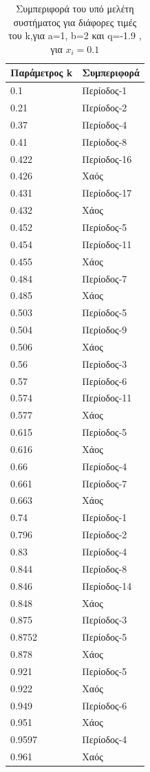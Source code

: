 \begin{table}[h!]
	\centering
	\begin{tabular}{l | l}
		Παράμετρος k & Συμπεριφορά \\
		\hline
		0.1 &  Περίοδος-1 \\
		0.21 &  Περίοδος-2 \\
		0.37& Περίοδος-4 \\
		0.41& Περίοδος-8 \\
		0.422 &  Περίοδος-16 \\
		0.426& Χαός \\
		0.431& Περίοδος-17 \\
		0.432& Χάος \\
		0.452 &  Περίοδος-5 \\
		0.454 &  Περίοδος-11 \\
		0.455 &  Χάος \\
		0.484 &  Περίοδος-7\\
		0.485 & Χάος\\
		0.503 & Περίοδος-5\\
		0.504 & Περίοδος-9\\
		0.506 &Χάος\\
		0.56 & Περίοδος-3\\
		0.57 & Περίοδος-6\\
		0.574 & Περίοδος-11\\
		0.577 & Χάος\\
		0.615 & Περίοδος-5\\
		0.616 & Χάος\\
		0.66 & Περίοδος-4\\
		0.661 & Περίοδος-7\\
		0.663 & Χάος\\
		0.74 &  Περίοδος-1\\
		0.796 &  Περίοδος-2 \\
		0.83& Περίοδος-4 \\
		0.844& Περίοδος-8 \\
		0.846 &  Περίοδος-14 \\
		0.848 &Χάος\\
		0.875& Περίοδος-3\\
		0.8752 & Περίοδος-5\\
		0.878 &Χάος\\
		0.921 &  Περίοδος-5 \\
		0.922& Χαός\\
		0.949 & Περίοδος-6 \\
		0.951& Χάος \\
		0.9597&Περίοδος-4\\
		0.961& Χαός\\
	
		
	\end{tabular}
	\caption{ Συμπεριφορά του υπό μελέτη συστήματος για διάφορες τιμές του k,για a=1, b=2 και q=-1.9 , για \(x_i=0.1\)}
	\label{tab:abc8}
\end{table}

